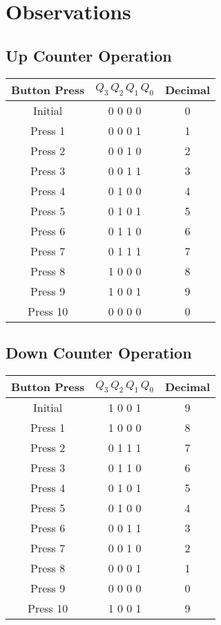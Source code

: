 \documentclass[12pt]{article}
\begin{document}
\section*{Observations}
\subsection*{Up Counter Operation}
\begin{center}
\begin{tabular}{|c|c|c|}
\hline
\textbf{Button Press} & \textbf{\(Q_3\,Q_2\,Q_1\,Q_0\)} & \textbf{Decimal} \\
\hline
Initial & 0 0 0 0 & 0 \\
\hline
Press 1 & 0 0 0 1 & 1 \\
\hline
Press 2 & 0 0 1 0 & 2 \\
\hline
Press 3 & 0 0 1 1 & 3 \\
\hline
Press 4 & 0 1 0 0 & 4 \\
\hline
Press 5 & 0 1 0 1 & 5 \\
\hline
Press 6 & 0 1 1 0 & 6 \\
\hline
Press 7 & 0 1 1 1 & 7 \\
\hline
Press 8 & 1 0 0 0 & 8 \\
\hline
Press 9 & 1 0 0 1 & 9 \\
\hline
Press 10 & 0 0 0 0 & 0 \\
\hline
\end{tabular}
\end{center}

\subsection*{Down Counter Operation}
\begin{center}
\begin{tabular}{|c|c|c|}
\hline
\textbf{Button Press} & \textbf{\(Q_3\,Q_2\,Q_1\,Q_0\)} & \textbf{Decimal} \\
\hline
Initial & 1 0 0 1 & 9 \\
\hline
Press 1 & 1 0 0 0 & 8 \\
\hline
Press 2 & 0 1 1 1 & 7 \\
\hline
Press 3 & 0 1 1 0 & 6 \\
\hline
Press 4 & 0 1 0 1 & 5 \\
\hline
Press 5 & 0 1 0 0 & 4 \\
\hline
Press 6 & 0 0 1 1 & 3 \\
\hline
Press 7 & 0 0 1 0 & 2 \\
\hline
Press 8 & 0 0 0 1 & 1 \\
\hline
Press 9 & 0 0 0 0 & 0 \\
\hline
Press 10 & 1 0 0 1 & 9 \\
\hline
\end{tabular}
\end{center}
\end{document}

